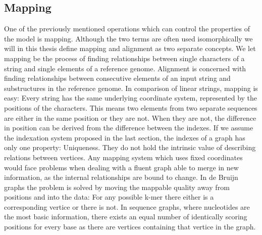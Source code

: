 \documentclass[thesis.tex]{subfiles}
\begin{document}
\subsection{Mapping}
\label{sec:mapping}
One of the previously mentioned operations which can control the properties of the model is mapping. Although the two terms are often used isomorphically we will in this thesis define mapping and alignment as two separate concepts. We let mapping be the process of finding relationships between single characters of a string and single elements of a reference genome. Alignment is concerned with finding relationships between consecutive elements of an input string and substructures in the reference genome. In comparison of linear strings, mapping is easy: Every string has the same underlying coordinate system, represented by the positions of the characters. This means two elements from two separate sequences are either in the same position or they are not. When they are not, the difference in position can be derived from the difference between the indexes. If we assume the indexation system proposed in the last section, the indexes of a graph has only one property: Uniqueness. They do not hold the intrinsic value of describing relations between vertices. Any mapping system which uses fixed coordinates would face problems when dealing with a fluent graph able to merge in new information, as the internal relationships are bound to change. In de Bruijn graphs the problem is solved by moving the mappable quality away from positions and into the data: For any possible k-mer there either is a corresponding vertice or there is not. In sequence graphs, where nucleotides are the most basic information, there exists an equal number of identically scoring positions for every base as there are vertices containing that vertice in the graph.\\
\par\noindent
\end{document}
